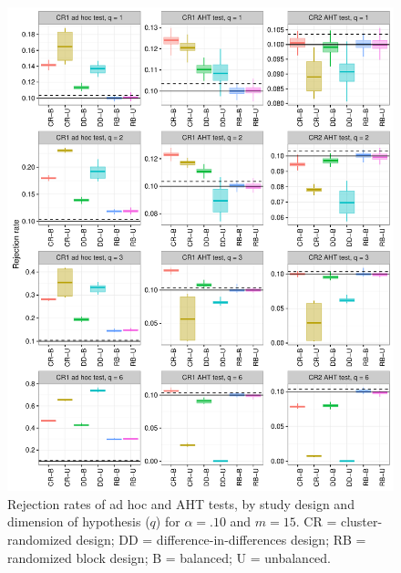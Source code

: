 \documentclass{article}\usepackage[]{graphicx}\usepackage[]{color}
\newenvironment{knitrout}{}{} %
\begin{document}
\begin{knitrout}
\color{fgcolor}\begin{figure}[H]

{\centering \includegraphics[width=\linewidth]{CR_fig/balance_10_15-1} 

}

\caption[Rejection rates of ad hoc and AHT tests, by study design and dimension of hypothesis (]{Rejection rates of ad hoc and AHT tests, by study design and dimension of hypothesis ($q$) for $\alpha = .10$ and $m = 15$. CR = cluster-randomized design; DD = difference-in-differences design; RB = randomized block design; B = balanced; U = unbalanced.}\label{fig:balance_10_15}
\end{figure}


\end{knitrout}
\end{document}
